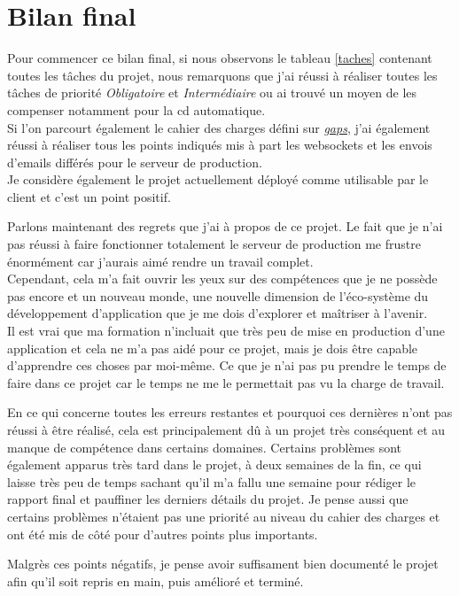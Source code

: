 \documentclass[
    iai, %
    il, %
]{heig-tb}
\begin{document}
\section{Bilan final}
Pour commencer ce bilan final, si nous observons le tableau \ref{taches} contenant toutes les tâches du projet, nous remarquons que j'ai réussi à réaliser toutes les tâches de priorité \emph{Obligatoire} et \emph{Intermédiaire} ou ai trouvé un moyen de les compenser notamment pour la \Gls{cd} automatique. \\
Si l'on parcourt également le cahier des charges défini sur \href{https://gaps.heig-vd.ch/consultation/diplome/affichage.php?id=6135&mode=HTML}{\emph{gaps}}, j'ai également réussi à réaliser tous les points indiqués mis à part les \Gls{websockets} et les envois d'emails différés pour le serveur de production.\\
Je considère également le projet actuellement déployé comme utilisable par le client et c'est un point positif.

Parlons maintenant des regrets que j'ai à propos de ce projet. Le fait que je n'ai pas réussi à faire fonctionner totalement le serveur de production me frustre énormément car j'aurais aimé rendre un travail complet. \\
Cependant, cela m'a fait ouvrir les yeux sur des compétences que je ne possède pas encore et un nouveau monde, une nouvelle dimension de l'éco-système du développement d'application que je me dois d'explorer et maîtriser à l'avenir. \\
Il est vrai que ma formation n'incluait que très peu de mise en production d'une application et cela ne m'a pas aidé pour ce projet, mais je dois être capable d'apprendre ces choses par moi-même. Ce que je n'ai pas pu prendre le temps de faire dans ce projet car le temps ne me le permettait pas vu la charge de travail.

En ce qui concerne toutes les erreurs restantes et pourquoi ces dernières n'ont pas réussi à être réalisé, cela est principalement dû à un projet très conséquent et au manque de compétence dans certains domaines. Certains problèmes sont également apparus très tard dans le projet, à deux semaines de la fin, ce qui laisse très peu de temps sachant qu'il m'a fallu une semaine pour rédiger le rapport final et pauffiner les derniers détails du projet. Je pense aussi que certains problèmes n'étaient pas une priorité au niveau du cahier des charges et ont été mis de côté pour d'autres points plus importants.

Malgrès ces points négatifs, je pense avoir suffisament bien documenté le projet afin qu'il soit repris en main, puis amélioré et terminé.
\end{document}
